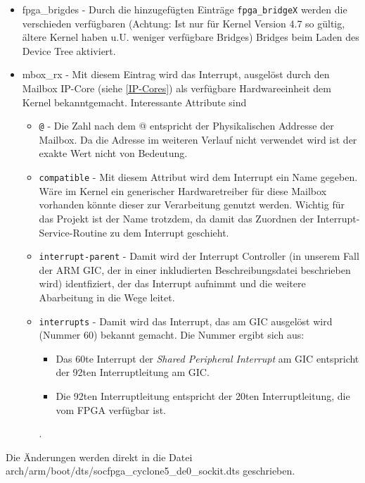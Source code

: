 \begin{itemize}
	\item fpga\_brigdes - Durch die hinzugefügten Einträge \texttt{fpga\_bridgeX} werden die verschieden verfügbaren (Achtung: Ist nur für Kernel Version 4.7 so gültig, ältere Kernel haben u.U. weniger verfügbare Bridges) Bridges beim Laden des Device Tree aktiviert.
	\item mbox\_rx - Mit diesem Eintrag wird das Interrupt, ausgelöst durch den Mailbox \ac{IP}-Core (siehe \ref{IP-Cores}) als verfügbare Hardwareeinheit dem Kernel bekanntgemacht. Interessante Attribute sind
	\begin{itemize}
		\item \texttt{@} - Die Zahl nach dem @ entspricht der Physikalischen Addresse der Mailbox. Da die Adresse im weiteren Verlauf nicht verwendet wird ist der exakte Wert nicht von Bedeutung.
		\item \texttt{compatible} - Mit diesem Attribut wird dem Interrupt ein Name gegeben. Wäre im Kernel ein generischer Hardwaretreiber für diese Mailbox vorhanden könnte dieser zur Verarbeitung genutzt werden. Wichtig für das Projekt ist der Name trotzdem, da damit das Zuordnen der Interrupt-Service-Routine zu dem Interrupt geschieht.
		\item \texttt{interrupt-parent} - Damit wird der Interrupt Controller (in unserem Fall der ARM GIC, der in einer inkludierten Beschreibungsdatei beschrieben wird) identfiziert, der das Interrupt aufnimmt und die weitere Abarbeitung in die Wege leitet.
		\item \texttt{interrupts} - Damit wird das Interrupt, das am GIC ausgelöst wird (Nummer 60) bekannt gemacht. Die Nummer ergibt sich aus: 
		\begin{itemize}
			\item Das 60te Interrupt der \textit{Shared Peripheral Interrupt} am GIC entspricht der 92ten Interruptleitung am GIC.
			\item Die 92ten Interruptleitung entspricht der 20ten Interruptleitung, die vom \ac{FPGA} verfügbar ist.
		\end{itemize} 
		\cite{interrupts_linux}.
	\end{itemize}
\end{itemize}
Die Änderungen werden direkt in die Datei arch/arm/boot/dts/socfpga\_cyclone5\_de0\_sockit.dts geschrieben.

